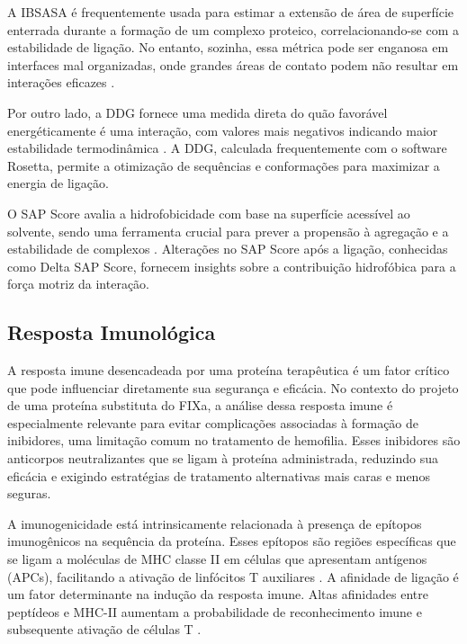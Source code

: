 A IBSASA é frequentemente usada para estimar a extensão de área de superfície enterrada durante a formação de um complexo proteico,
correlacionando-se com a estabilidade de ligação. 
No entanto, sozinha, essa métrica pode ser enganosa em interfaces mal organizadas, 
onde grandes áreas de contato podem não resultar em interações eficazes \cite{Docking}. 

Por outro lado, a DDG fornece uma medida direta do quão favorável energéticamente é uma interação,
com valores mais negativos indicando maior estabilidade termodinâmica \cite{Docking}. 
A DDG, calculada frequentemente com o software Rosetta, 
permite a otimização de sequências e conformações para maximizar a energia de ligação.

O SAP Score avalia a hidrofobicidade com base na superfície acessível ao solvente, 
sendo uma ferramenta crucial para prever a propensão à agregação e a estabilidade de complexos \cite{Docking}.
Alterações no SAP Score após a ligação, conhecidas como Delta SAP Score, 
fornecem insights sobre a contribuição hidrofóbica para a força motriz da interação.






\subsection{Resposta Imunológica}


A resposta imune desencadeada por uma proteína terapêutica é um fator crítico que pode influenciar diretamente sua segurança e eficácia. 
No contexto do projeto de uma proteína substituta do FIXa,
a análise dessa resposta imune é especialmente relevante para evitar complicações associadas à formação de inibidores,
uma limitação comum no tratamento de hemofilia. 
Esses inibidores são anticorpos neutralizantes que se ligam à proteína administrada,
reduzindo sua eficácia e exigindo estratégias de tratamento alternativas mais caras e menos seguras.

A imunogenicidade está intrinsicamente relacionada à presença de epítopos imunogênicos na sequência da proteína. 
Esses epítopos são regiões específicas que se ligam a moléculas de MHC classe II em células que apresentam antígenos (APCs), 
facilitando a ativação de linfócitos T auxiliares \cite{Imuno}. 
A afinidade de ligação é um fator determinante na indução da resposta imune. 
Altas afinidades entre peptídeos e MHC-II aumentam a probabilidade de reconhecimento imune e subsequente ativação de células T \cite{Imuno}.

